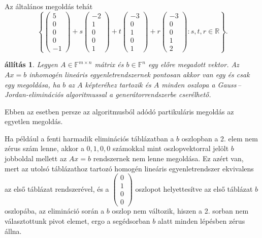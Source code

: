 \documentclass[a4paper, showtrims]{memoir}
\theoremstyle{plain}
\newtheorem{proposition}{állítás}[chapter]
\theoremstyle{remark}
\theoremstyle{definition}
\begin{document}
Az általános megoldás tehát
\[
	\left\{
	\begin{pmatrix}
		5 \\0\\0\\0\\-1
	\end{pmatrix}
	+s
	\begin{pmatrix}
		-2 \\1\\0\\0\\1
	\end{pmatrix}
	+t
	\begin{pmatrix}
		-3 \\0\\1\\0\\1
	\end{pmatrix}
	+r
	\begin{pmatrix}
		-3 \\0\\0\\1\\2
	\end{pmatrix}
	:s,t,r\in\mathbb{R}
	\right\}.
\]
\begin{proposition}
    Legyen $A\in\mathbb{F}^{m\times n}$ mátrix és $b\in\mathbb{F}^n$ egy előre megadott vektor.
	Az $Ax=b$ inhomogén lineáris egyenletrendszernek pontosan akkor van egy és csak egy
	megoldása, ha $b$ az $A$ képteréhez tartozik 
    és $A$ minden oszlopa a Gauss\,--\,Jordan-eliminációs algoritmussal
    a generátorrendszerbe cserélhető.
\end{proposition}
Ebben az esetben persze az algoritmusból adódó partikuláris megoldás az egyetlen megoldás.

Ha például a fenti harmadik eliminációs táblázatban a $b$ oszlopban a 2. elem nem zérus szám lenne,
akkor a $0,1,0,0$ számokkal mint oszlopvektorral jelölt $b$ jobboldal mellett az $Ax=b$ rendszernek nem lenne megoldása. 
Ez azért van, mert az utolsó táblázathoz tartozó homogén lineáris egyenletrendszer ekvivalens az első táblázat rendszerével, és a 
\(
\begin{pmatrix}0\\1\\0\\0\end{pmatrix}
\)
oszlopot helyettesítve az első táblázat $b$ oszlopába, az elimináció során a $b$ oszlop nem változik, hiszen a 2. sorban nem választottunk pivot elemet, ergo a segédsorban $b$ alatt minden lépésben zérus állna.
\end{document}
